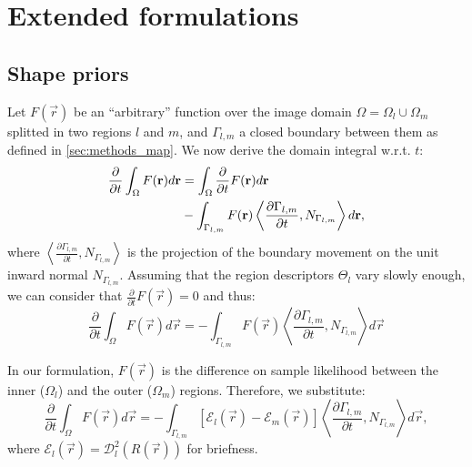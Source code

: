 
\section{Extended formulations}

\subsection{Shape priors}
\label{app:shape_priors}
Let $F(\vec{r})$ be an ``arbitrary'' function over the image domain
  $\Omega = \Omega_l \cup \Omega_m$ splitted in two regions $l$ and
  $m$, and $\Gamma_{l,m}$ a closed boundary between them
  as defined in \autoref{sec:methods_map}.
We now derive the domain integral w.r.t. $t$:
  \begin{align*}
  \frac{\partial}{\partial t} \int_\Omega F(\vec{r}) d\vec{r} &=
  \int_\Omega \frac{\partial}{\partial t}F(\vec{r}) d\vec{r} \notag\\
  &- \int_{\Gamma_{l,m}} F(\vec{r}) \left\langle \frac{\partial \Gamma_{l,m} }{\partial t},
  N_{\Gamma_{l,m}}\right\rangle d\vec{r},
  \end{align*}
  where $\left\langle\frac{\partial\Gamma_{l,m}}{\partial t}, N_{\Gamma_{l,m}}\right\rangle$ is
  the projection of the boundary movement on the unit inward normal $N_{\Gamma_{l,m}}$.
Assuming that the region descriptors $\Theta_l$ vary slowly enough, we can consider
  that $\frac{\partial}{\partial t} F(\vec{r}) = 0$ and thus:
  \begin{equation*}
  \frac{\partial}{\partial t} \int_\Omega F(\vec{r}) d\vec{r} =
  - \int_{\Gamma_{l,m}} F(\vec{r}) \left\langle \frac{\partial \Gamma_{l,m} }{\partial t},
  N_{\Gamma_{l,m}}\right\rangle d\vec{r}
  \end{equation*}

  In our formulation, $F(\vec{r})$ is the difference on
    sample likelihood between the inner ($\Omega_l$) and the outer ($\Omega_m$) regions.
  Therefore, we substitute:
    \begin{equation}
    \frac{\partial}{\partial t} \int_\Omega F(\vec{r}) d\vec{r} =
    - \int_{\Gamma_{l,m}} \left[ \mathcal{E}_{l}(\vec{r}) - \mathcal{E}_{m}(\vec{r}) \right]
    \left\langle \frac{\partial \Gamma_{l,m} }{\partial t},
  N_{\Gamma_{l,m}}\right\rangle d\vec{r},
  	\label{eq:shape_gradients}
    \end{equation}
    where $\mathcal{E}_l(\vec{r}) = \mathcal{D}^2_{l}(R(\vec{r}))$ for briefness.
